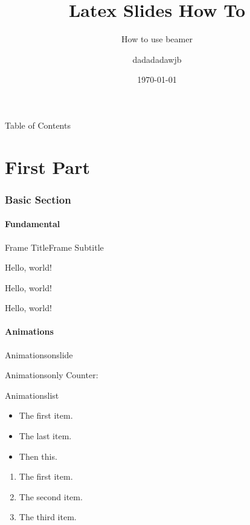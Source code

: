 \documentclass[xcolor=table]{beamer}
\title[SlidesHowTo]{Latex Slides How To}
\subtitle[beamer]{How to use beamer}
\author[wjb]{dadadadawjb}
\institute[SJTU]{Shanghai Jiao Tong University}
\date{\today}
\begin{document}
    \begin{frame}
        \thispagestyle{empty}
        \titlepage
    \end{frame}

    \begin{frame}{Table of Contents}
        \addtocounter{framenumber}{-2}
        \tableofcontents[onlyparts]
    \end{frame}

    \part{First Part}
    \section{Basic Section}
    \subsection{Fundamental}
    \begin{frame}{Frame Title}{Frame Subtitle}

        \pause
        Hello, world!

        \pause
        Hello, world!

        \pause
        Hello, world!
    \end{frame}

    \subsection{Animations}
    \begin{frame}{Animations}{onslide}


    \end{frame}

    \begin{frame}{Animations}{only}
        Counter: 

    \end{frame}

    \begin{frame}{Animations}{list}
        \begin{itemize}
            \item<1-> The first item.
            \item<3-> The last item.
            \item<2-> Then this.
        \end{itemize}

        \begin{enumerate}[<+->]
            \item The first item.
            \item The second item.
            \item The third item.
        \end{enumerate}
    \end{frame}
\end{document}
